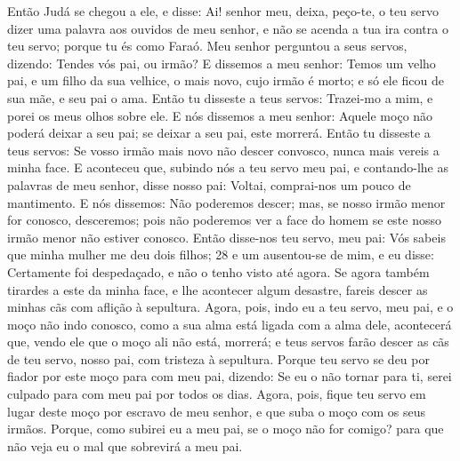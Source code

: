 Então Judá se chegou a ele, e disse: Ai! senhor meu, deixa,
peço-te, o teu servo dizer uma palavra aos ouvidos de meu senhor, e
não se acenda a tua ira contra o teu servo; porque tu és como Faraó.
Meu senhor perguntou a seus servos, dizendo: Tendes vós pai,
ou irmão? E dissemos a meu senhor: Temos um velho pai, e um
filho da sua velhice, o mais novo, cujo irmão é morto; e só ele
ficou de sua mãe, e seu pai o ama. Então tu disseste a teus
servos: Trazei-mo a mim, e porei os meus olhos sobre ele. E
nós dissemos a meu senhor: Aquele moço não poderá deixar a seu pai;
se deixar a seu pai, este morrerá. Então tu disseste a teus
servos: Se vosso irmão mais novo não descer convosco, nunca mais
vereis a minha face. E aconteceu que, subindo nós a teu servo
meu pai, e contando-lhe as palavras de meu senhor, disse
nosso pai: Voltai, comprai-nos um pouco de mantimento. E nós
dissemos: Não poderemos descer; mas, se nosso irmão menor for
conosco, desceremos; pois não poderemos ver a face do homem se este
nosso irmão menor não estiver conosco. Então disse-nos teu
servo, meu pai: Vós sabeis que minha mulher me deu dois filhos; 28 e
um ausentou-se de mim, e eu disse: Certamente foi despedaçado, e não
o tenho visto até agora. Se agora também tirardes a este da
minha face, e lhe acontecer algum desastre, fareis descer as minhas
cãs com aflição à sepultura. Agora, pois, indo eu a teu
servo, meu pai, e o moço não indo conosco, como a sua alma está
ligada com a alma dele, acontecerá que, vendo ele que o moço
ali não está, morrerá; e teus servos farão descer as cãs de teu
servo, nosso pai, com tristeza à sepultura. Porque teu servo
se deu por fiador por este moço para com meu pai, dizendo: Se eu o
não tornar para ti, serei culpado para com meu pai por todos os
dias. Agora, pois, fique teu servo em lugar deste moço por
escravo de meu senhor, e que suba o moço com os seus irmãos.
Porque, como subirei eu a meu pai, se o moço não for comigo?
para que não veja eu o mal que sobrevirá a meu pai.

\smallskip

